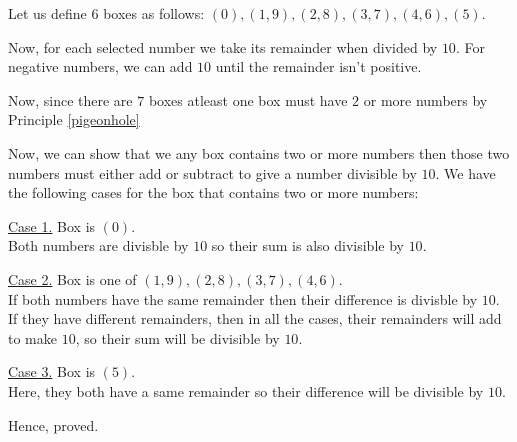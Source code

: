 \begin{solution}
	Let us define $6$ boxes as follows: $(0), (1,9), (2,8), (3,7), (4,6), (5)$.

	Now, for each selected number we take its remainder when divided by $10$.
	For negative numbers, we can add $10$ until the remainder isn't positive.

	Now, since there are $7$ boxes atleast one box must have $2$ or more numbers by Principle \ref{pigeonhole}

	Now, we can show that we any box contains two or more numbers then those two numbers must either add or subtract to give a number divisible by $10$. We have the following cases for the box that contains two or more numbers:

	\underline{Case 1.} Box is $(0)$. \\
	Both numbers are divisble by $10$ so their sum is also divisible by $10$.

	\underline{Case 2.} Box is one of $(1,9),(2,8),(3,7),(4,6)$. \\
	If both numbers have the same remainder then their difference is divisble by $10$. \\
	If they have different remainders, then in all the cases, their remainders will add to make $10$, so their sum will be divisible by $10$.

	\underline{Case 3.} Box is $(5)$. \\
	Here, they both have a same remainder so their difference will be divisible by $10$.

	Hence, proved. 
\end{solution}
